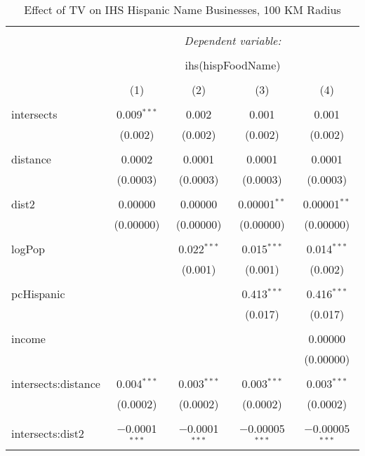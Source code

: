 
\begin{table}[!htbp] \centering 
  \caption{Effect of TV on IHS Hispanic Name Businesses, 100 KM Radius} 
  \label{} 
\begin{tabular}{@{\extracolsep{-5pt}}lcccc} 
\\[-1.8ex]\hline 
\hline \\[-1.8ex] 
 & \multicolumn{4}{c}{\textit{Dependent variable:}} \\ 
\cline{2-5} 
\\[-1.8ex] & \multicolumn{4}{c}{ihs(hispFoodName)} \\ 
\\[-1.8ex] & (1) & (2) & (3) & (4)\\ 
\hline \\[-1.8ex] 
 intersects & 0.009$^{***}$ & 0.002 & 0.001 & 0.001 \\ 
  & (0.002) & (0.002) & (0.002) & (0.002) \\ 
  & & & & \\ 
 distance & 0.0002 & 0.0001 & 0.0001 & 0.0001 \\ 
  & (0.0003) & (0.0003) & (0.0003) & (0.0003) \\ 
  & & & & \\ 
 dist2 & 0.00000 & 0.00000 & 0.00001$^{**}$ & 0.00001$^{**}$ \\ 
  & (0.00000) & (0.00000) & (0.00000) & (0.00000) \\ 
  & & & & \\ 
 logPop &  & 0.022$^{***}$ & 0.015$^{***}$ & 0.014$^{***}$ \\ 
  &  & (0.001) & (0.001) & (0.002) \\ 
  & & & & \\ 
 pcHispanic &  &  & 0.413$^{***}$ & 0.416$^{***}$ \\ 
  &  &  & (0.017) & (0.017) \\ 
  & & & & \\ 
 income &  &  &  & 0.00000 \\ 
  &  &  &  & (0.00000) \\ 
  & & & & \\ 
 intersects:distance & 0.004$^{***}$ & 0.003$^{***}$ & 0.003$^{***}$ & 0.003$^{***}$ \\ 
  & (0.0002) & (0.0002) & (0.0002) & (0.0002) \\ 
  & & & & \\ 
 intersects:dist2 & $-$0.0001$^{***}$ & $-$0.0001$^{***}$ & $-$0.00005$^{***}$ & $-$0.00005$^{***}$ \\ 

\end{tabular}
\end{table}
